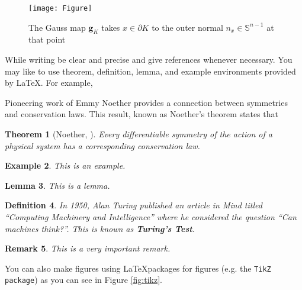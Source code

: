 \documentclass[12pt, a4paper,oneside]{book}
\newtheorem{theorem}{Theorem}[section]
\newtheorem{lemma}[theorem]{Lemma}
\newtheorem{definition}[theorem]{Definition}
\newtheorem{example}[theorem]{Example}
\newtheorem{remark}[theorem]{Remark}
\numberwithin{equation}{section}
\begin{document}
\begin{figure}[htb]
\centerline{\texttt{[image: Figure]}}
\caption{The Gauss map $\mathbf{g}_{K}$ takes $x\in \partial K$ to the outer normal $n_x\in\mathbb{S}^{n-1}$ at that point}
\label{fig:A3.1}
\end{figure}


While writing be clear and precise and give references whenever necessary. You may like to use theorem, definition, lemma, and example environments provided by \LaTeX. For example,

Pioneering work of Emmy Noether \cite{Noether} provides a connection between symmetries and conservation laws. This result, known as Noether's theorem states that

\begin{theorem}[Noether, \cite{Noether}]
Every differentiable symmetry of the action of a physical system has a corresponding conservation law.
\end{theorem}

\begin{example}
This is an example.
\end{example}

\begin{lemma}
This is a lemma.
\end{lemma}

\begin{definition}
In 1950, Alan Turing published an article \cite{Turing} in \textit{Mind}
titled ``Computing Machinery and Intelligence'' where he considered the question ``Can machines think?''. This is known as {\bf Turing's Test}.
\end{definition}

\begin{remark}
This is a very important remark.
\end{remark}

You can also make figures  using \LaTeX packages for figures (e.g. the {\tt TikZ package}) as you can see in Figure \ref{fig:tikz}.
\end{document}
